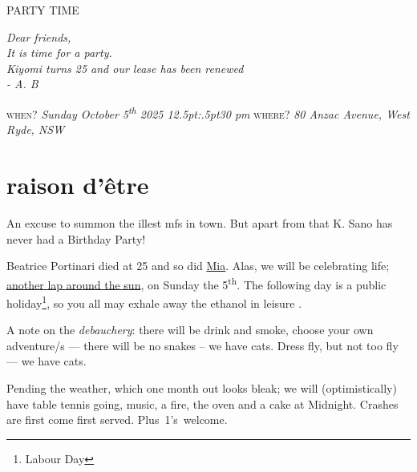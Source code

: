 \documentclass[dvipsnames]{article}
\begin{document}
%
\obeylines%
{ PARTY TIME}

\bigbreak
\textit{%
    Dear friends,\\


    It is time for a party. \\



    Kiyomi turns 25 and our lease has been renewed \\


    - A. B
}

\bigskip

{\scshape when?}
\textit{%
  Sunday October 5\/\rlap{,}\textsuperscript{th} 2025
  12\kern.5pt:\kern.5pt30 pm
}
\medbreak
{\scshape where?}
\textit{%
  80 Anzac Avenue,
  West Ryde,
  NSW
}

\newpage
\enlargethispage{1cm}
\section*{raison d'être}

An excuse to summon the illest mfs in town. But apart from that K. Sano has never had a Birthday Party!

Beatrice Portinari died at 25 and so did \href{https://abaj.ai/blog/mia/}{Mia}. Alas, we will be celebrating life; \href{https://frizzande.io/articles/thirty_three/}{another lap around the sun}, on Sunday the 5\textsuperscript{th}. The following day is a public holiday\footnote{Labour Day}, so you all may exhale away the ethanol in leisure .

A note on the \emph{debauchery}: there will be drink and smoke, choose your own adventure/s --- there will be no snakes -- we have cats. Dress fly, but not too fly --- we have cats.

Pending the weather, which one month out looks bleak; we will (optimistically) have table tennis going, music, a fire, the oven and a cake at Midnight. Crashes are first come first served. \mbox{Plus 1's welcome.}
\end{document}
